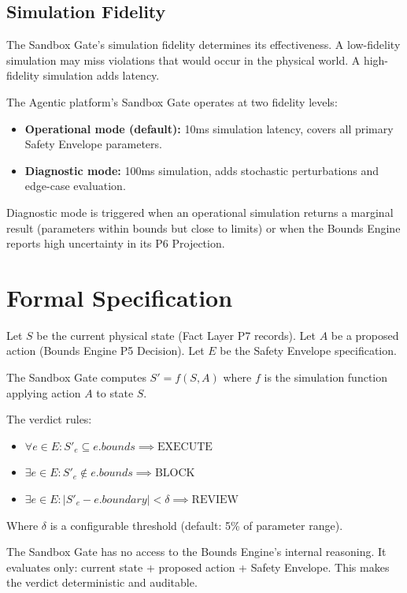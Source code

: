 \documentclass[12pt]{article}
\begin{document}
\subsection{Simulation Fidelity}

The Sandbox Gate's simulation fidelity determines its effectiveness. A low-fidelity simulation may miss violations that would occur in the physical world. A high-fidelity simulation adds latency.

The Agentic platform's Sandbox Gate operates at two fidelity levels:

\begin{itemize}
    \item \textbf{Operational mode (default):} 10ms simulation latency, covers all primary Safety Envelope parameters.
    \item \textbf{Diagnostic mode:} 100ms simulation, adds stochastic perturbations and edge-case evaluation.
\end{itemize}

Diagnostic mode is triggered when an operational simulation returns a marginal result (parameters within bounds but close to limits) or when the Bounds Engine reports high uncertainty in its P6 Projection.

\section{Formal Specification}
\label{sec:formal}

Let $S$ be the current physical state (Fact Layer P7 records). Let $A$ be a proposed action (Bounds Engine P5 Decision). Let $E$ be the Safety Envelope specification.

The Sandbox Gate computes $S' = f(S, A)$ where $f$ is the simulation function applying action $A$ to state $S$.

The verdict rules:

\begin{itemize}
    \item $\forall e \in E: S'_e \subseteq e.bounds \implies \text{EXECUTE}$
    \item $\exists e \in E: S'_e \notin e.bounds \implies \text{BLOCK}$
    \item $\exists e \in E: |S'_e - e.boundary| < \delta \implies \text{REVIEW}$
\end{itemize}

Where $\delta$ is a configurable threshold (default: 5\% of parameter range).

The Sandbox Gate has no access to the Bounds Engine's internal reasoning. It evaluates only: current state + proposed action + Safety Envelope. This makes the verdict deterministic and auditable.
\end{document}
